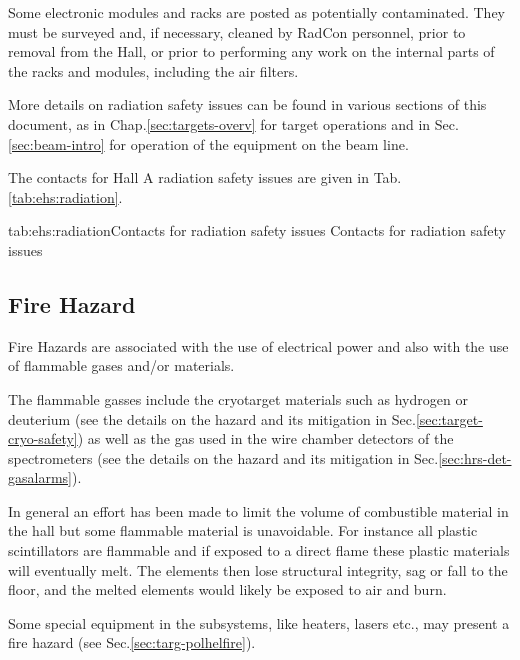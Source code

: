 Some electronic modules and racks are posted as potentially contaminated.
 They must be surveyed and, if necessary, cleaned by RadCon personnel,
 prior to removal from the Hall, or prior to performing any work on the internal parts of the racks
 and modules, including the air filters. 
 
 More details on radiation safety issues can be found in various sections of this 
 document, as in Chap.\ref{sec:targets-overv} for target operations and
 in Sec.\ref{sec:beam-intro} for operation of the equipment on the beam line.
 
 The contacts for Hall A radiation safety issues are given in Tab.\ref{tab:ehs:radiation}.
 
 \begin{namestab}{tab:ehs:radiation}{Contacts for radiation safety issues}{%
   Contacts for radiation safety issues}
 \end{namestab}


\begin{safetyen}{0}{0}
\section{Fire Hazard} 
\label{sec:firehazard}
\end{safetyen}

 Fire Hazards are associated with the use of electrical power and also with the use of 
 flammable gases and/or materials. 

 The flammable gasses include the cryotarget
 materials such as hydrogen or deuterium 
 (see the details on the hazard and its mitigation in Sec.\ref{sec:target-cryo-safety}) as well as
 the gas used in the wire chamber detectors of the spectrometers 
 (see the details on the hazard and its mitigation in Sec.\ref{sec:hrs-det-gasalarms}).
 
 In general an effort has been made to limit the volume of combustible material 
 in the hall but some flammable material is unavoidable. For instance all plastic 
 scintillators are flammable and if exposed to a direct flame these 
 plastic materials will eventually melt. The elements then lose structural integrity, 
 sag or fall to the floor, and the melted elements would likely be exposed to air and burn.

 Some special equipment in the subsystems, like heaters, lasers etc., may present a
 fire hazard (see Sec.\ref{sec:targ-polhelfire}).
 
